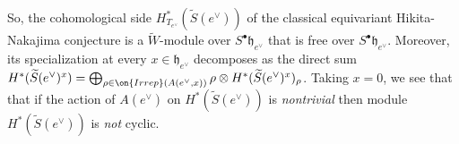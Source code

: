 \documentclass[12pt]{amsart}
\begin{document}






So, the cohomological side $H^*_{T_{e^\vee}}(\widetilde{S}(e^\vee))$  of the classical equivariant Hikita-Nakajima conjecture is a $\widetilde{W}$-module over $S^\bullet\mathfrak{h}_{e^\vee}$ that is free over $S^\bullet\mathfrak{h}_{e^\vee}$. Moreover, its specialization at every $x \in \mathfrak{h}_{e^\vee}$ decomposes as the direct sum $H^*(\widetilde{S}(e^\vee)^x) = \bigoplus_{\rho \in \on{Irrep}(A(e^\vee,x))} \rho \otimes H^*(\widetilde{S}(e^\vee)^x)_\rho$. 
Taking $x=0$, we see that that if the action of $A(e^\vee)$ on $H^*(\widetilde{S}(e^\vee))$ is {\em{nontrivial}} then module $H^*(\widetilde{S}(e^\vee))$ is {\emph{not}} cyclic.
\end{document}
